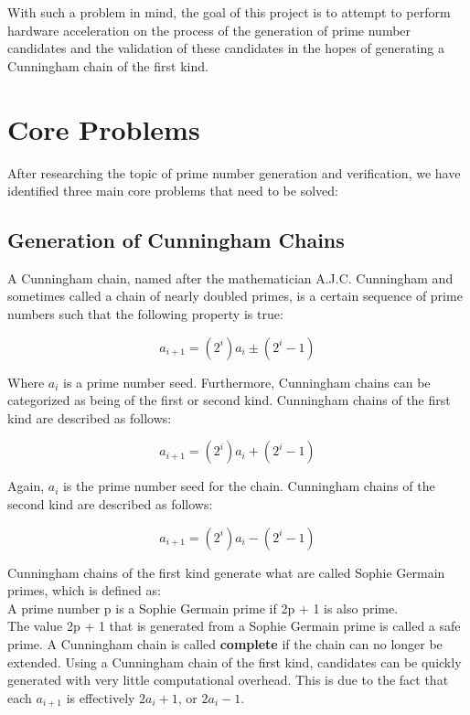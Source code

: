 \documentclass[journal]{IEEEtran}
\begin{document}
With such a problem in mind, the goal of this project is to attempt to perform hardware acceleration on the process of the generation of prime number candidates and the validation of these candidates in the hopes of generating a Cunningham chain of the first kind.


 

\section{Core Problems}
After researching the topic of prime number generation and verification, we have identified three main core problems that need to be solved:

\subsection{Generation of Cunningham Chains}
A Cunningham chain, named after the mathematician A.J.C. Cunningham and sometimes called a chain of nearly doubled primes, is a certain sequence of prime numbers such that the following property is true:

\begin{displaymath}
	a_{i + 1} = (2^{i}) a_{i} \pm (2^{i} - 1)
\end{displaymath}

Where $a_{i}$ is a prime number seed. Furthermore, Cunningham chains can be categorized as being of the first or second kind. Cunningham chains of the first kind are described as follows:

\begin{displaymath}
	a_{i + 1} = (2^{i})a_{i} + (2^{i} - 1)
\end{displaymath}

Again, $a_{i}$ is the prime number seed for the chain. Cunningham chains of the second kind are described as follows:

\begin{displaymath}
	a_{i + 1} = (2^{i})a_{i} - (2^{i} - 1)
\end{displaymath}

Cunningham chains of the first kind generate what are called Sophie Germain primes, which is defined as:\\

A prime number p is a Sophie Germain prime if 2p + 1 is also prime.\\

The value 2p + 1 that is generated from a Sophie Germain prime is called a safe prime. A Cunningham chain is called \textbf{complete} if the chain can no longer be extended. Using a Cunningham chain of the first kind, candidates can be quickly generated with very little computational overhead. This is due to the fact that each $a_{i+1}$ is effectively $2a_{i} + 1$, or $2a_{i} - 1$. 
\end{document}
